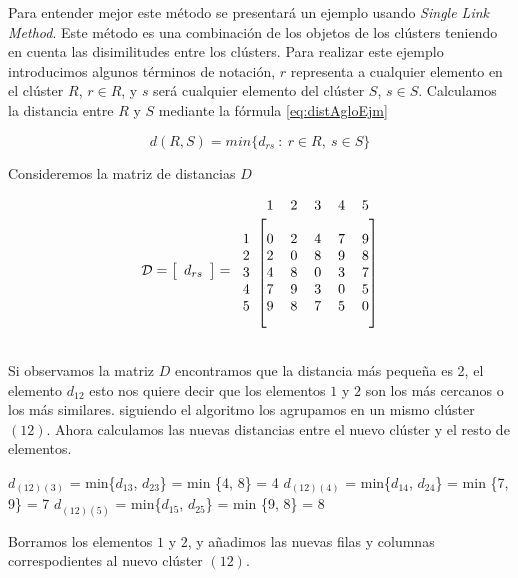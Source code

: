 \documentclass[a4paper, 20pt]{article}
\begin{document}
Para entender mejor este método se presentará un ejemplo usando \textit{Single Link Method}. Este método es una combinación de los objetos de los clústers teniendo en cuenta las disimilitudes entre los clústers. Para realizar este ejemplo introducimos algunos términos de notación, $r$ representa a cualquier elemento en el clúster $R$, $r \in R$, y $s$ será cualquier elemento del clúster $S$, $s \in S$. Calculamos la distancia entre $R$ y $S$ mediante la  fórmula \ref{eq:distAgloEjm}

\begin{equation}\label{eq:distAgloEjm}
	d(R, S) = min \{d_{rs}\ :\ r \in R, \ s \in S\}
\end{equation}

Consideremos la matriz de distancias $D$

\[ \mathcal{D} =
\left[ \begin{array}{c}
d_{rs}
\end{array} \right] =
\begin{blockarray}{cccccc}
	& 1 & 2 & 3 & 4 & 5 \\
	\begin{block}{c[ccccc]}
		\\
		1 & 0 & 2 & 4 & 7 & 9 \\
		2 & 2 & 0 & 8 & 9 & 8 \\
		3 & 4 & 8 & 0 & 3 & 7 \\
		4 & 7 & 9 & 3 & 0 & 5 \\
		5 & 9 & 8 & 7 & 5 & 0 \\
		\\
	\end{block}
\end{blockarray}  
\] 

Si observamos la matriz $D$ encontramos que la distancia más pequeña es 2, el elemento $d_{12}$ esto nos quiere decir que los elementos $1$ y $2$ son los más cercanos o los más similares. siguiendo el algoritmo los agrupamos en un mismo clúster $(12)$. Ahora calculamos las nuevas distancias entre el nuevo clúster y el resto de elementos.

\begin{center}
	$d_{(12)(3)}$ = min\{$d_{13}$, $d_{23}$\} = min \{4, 8\} = 4
	$d_{(12)(4)}$ = min\{$d_{14}$, $d_{24}$\} = min \{7, 9\} = 7
	$d_{(12)(5)}$ = min\{$d_{15}$, $d_{25}$\} = min \{9, 8\} = 8
\end{center}

Borramos los elementos $1$ y $2$, y añadimos las nuevas filas y columnas correspodientes al nuevo clúster $(12)$.
\end{document}
